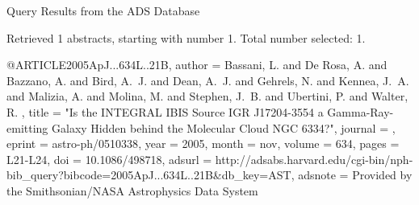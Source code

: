 Query Results from the ADS Database


Retrieved 1 abstracts, starting with number 1.  Total number selected: 1.

@ARTICLE{2005ApJ...634L..21B,
   author = {{Bassani}, L. and {De Rosa}, A. and {Bazzano}, A. and {Bird}, A.~J. and 
	{Dean}, A.~J. and {Gehrels}, N. and {Kennea}, J.~A. and {Malizia}, A. and 
	{Molina}, M. and {Stephen}, J.~B. and {Ubertini}, P. and {Walter}, R.
	},
    title = "{Is the INTEGRAL IBIS Source IGR J17204-3554 a Gamma-Ray-emitting Galaxy Hidden behind the Molecular Cloud NGC 6334?}",
  journal = {\apjl},
   eprint = {astro-ph/0510338},
     year = 2005,
    month = nov,
   volume = 634,
    pages = {L21-L24},
      doi = {10.1086/498718},
   adsurl = {http://adsabs.harvard.edu/cgi-bin/nph-bib_query?bibcode=2005ApJ...634L..21B&db_key=AST},
  adsnote = {Provided by the Smithsonian/NASA Astrophysics Data System}
}


